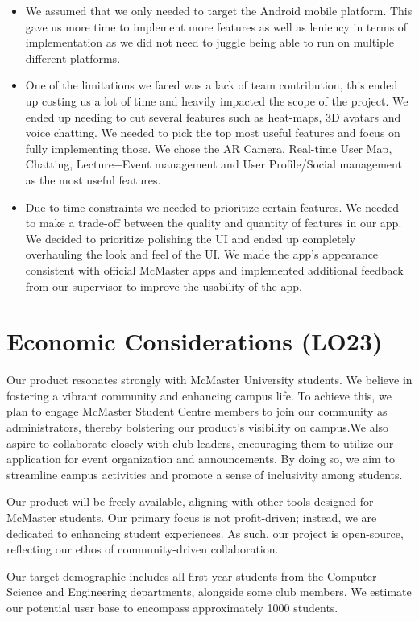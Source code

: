 \documentclass{article}
\begin{document}
\begin{itemize}
\item We assumed that we only needed to target the Android mobile platform. This gave us more time to implement more features as well as leniency in terms of implementation as we did not need to juggle being able to run on multiple different platforms.
\item One of the limitations we faced was a lack of team contribution, this ended up costing us a lot of time and heavily impacted the scope of the project. We ended up needing to cut several features such as heat-maps, 3D avatars and voice chatting. We needed to pick the top most useful features and focus on fully implementing those. We chose the AR Camera, Real-time User Map, Chatting, Lecture+Event management and User Profile/Social management as the most useful features. 
\item Due to time constraints we needed to prioritize certain features. We needed to make a trade-off between the quality and quantity of features in our app. We decided to prioritize polishing the UI and ended up completely overhauling the look and feel of the UI. We made the app's appearance consistent with official McMaster apps and implemented additional feedback from our supervisor to improve the usability of the app. 
\end{itemize}

\section{Economic Considerations (LO23)}
Our product resonates strongly with McMaster University students. We believe in fostering a vibrant community and enhancing campus life. To achieve this, we plan to engage McMaster Student Centre members to join our community as administrators, thereby bolstering our product's visibility on campus.We also aspire to collaborate closely with club leaders, encouraging them to utilize our application for event organization and announcements. By doing so, we aim to streamline campus activities and promote a sense of inclusivity among students.

Our product will be freely available, aligning with other tools designed for McMaster students. Our primary focus is not profit-driven; instead, we are dedicated to enhancing student experiences. As such, our project is open-source, reflecting our ethos of community-driven collaboration.

Our target demographic includes all first-year students from the Computer Science and Engineering departments, alongside some club members. We estimate our potential user base to encompass approximately 1000 students.
\end{document}
